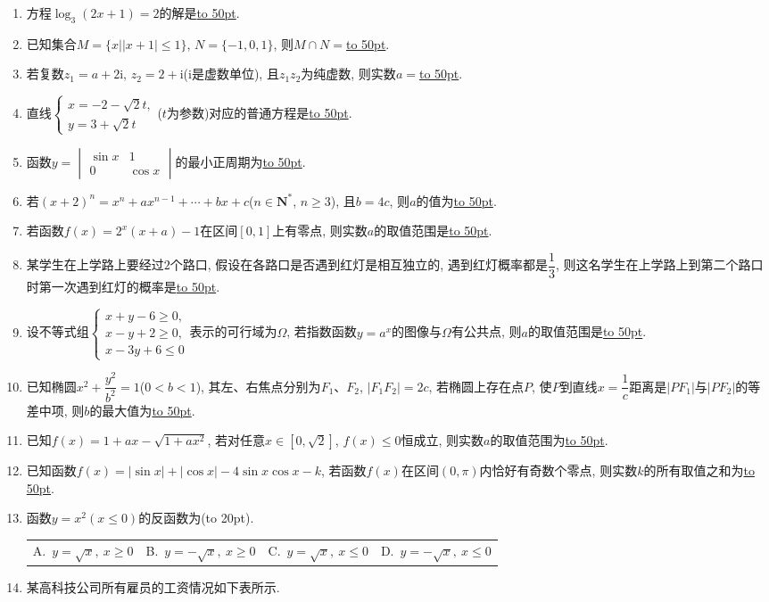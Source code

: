 \documentclass[10pt,a4paper]{article}
\newcommand{\blank}[1]{\underline{\hbox to #1pt{}}}
\newcommand{\bracket}[1]{(\hbox to #1pt{})}
\newcommand{\fourch}[4]{\par\begin{tabular}{p{.23\textwidth}p{.23\textwidth}p{.23\textwidth}p{.23\textwidth}}
A.~#1 &B.~#2& C.~#3& D.~#4
\end{tabular}}
\begin{document}
\begin{enumerate}[1.]
\item 方程$\log_3(2x+1)=2$的解是\blank{50}.
\item 已知集合$M=\{x||x+1|\le 1\}$, $N=\{-1,0,1\}$, 则$M\cap N=$\blank{50}.
\item 若复数$z_1=a+2\mathrm{i}$, $z_2=2+\mathrm{i}$($\mathrm{i}$是虚数单位), 且$z_1z_2$为纯虚数, 则实数$a=$\blank{50}.
\item 直线$\begin{cases} x=-2-\sqrt 2t, \\ y=3+\sqrt 2t \end{cases}$($t$为参数)对应的普通方程是\blank{50}.
\item 函数$y=\begin{vmatrix}
   \sin x & 1  \\0 & \cos x  \end{vmatrix}$的最小正周期为\blank{50}.
\item 若$(x+2)^n=x^n+ax^{n-1}+\cdots +bx+c$($n\in \mathbf{N}^*$, $ n\ge 3$), 且$b=4c$, 则$a$的值为\blank{50}.
\item 若函数$f(x)=2^x(x+a)-1$在区间$[0,1]$上有零点, 则实数$a$的取值范围是\blank{50}.
\item 某学生在上学路上要经过$2$个路口, 假设在各路口是否遇到红灯是相互独立的, 遇到红灯概率都是$\dfrac 13$, 则这名学生在上学路上到第二个路口时第一次遇到红灯的概率是\blank{50}.
\item 设不等式组$\begin{cases} x+y-6\ge 0, \\ x-y+2\ge 0, \\ x-3y+6\le 0 \end{cases}$表示的可行域为$\Omega$, 若指数函数$y=a^x$的图像与$\Omega$有公共点, 则$a$的取值范围是\blank{50}.
\item 已知椭圆$x^2+\dfrac{y^2}{b^2}=1$($0<b<1$), 其左、右焦点分别为$F_1$、$F_2$, $|F_1F_2|=2c$, 若椭圆上存在点$P$, 使$P$到直线$x=\dfrac 1c$距离是$|PF_1|$与$|PF_2|$的等差中项, 则$b$的最大值为\blank{50}.
\item 已知$f(x)=1+ax-\sqrt{1+ax^2}$, 若对任意$x\in [0,\sqrt 2]$, $f(x)\le 0$恒成立, 则实数$a$的取值范围为\blank{50}.
\item 已知函数$f(x)=|\sin x|+|\cos x|-4\sin x\cos x-k$, 若函数$f(x)$在区间$(0,\pi)$内恰好有奇数个零点, 则实数$k$的所有取值之和为\blank{50}.
\item 函数$y=x^2(x\le 0)$的反函数为\bracket{20}.
\fourch{$y=\sqrt{x}, \ x\ge 0$}{$y=-\sqrt{x}, \ x\ge 0$}{$y=\sqrt{x}, \ x\le 0$}{$y=-\sqrt{x}, \ x\le 0$}
\item 某高科技公司所有雇员的工资情况如下表所示.

\end{enumerate}
\end{document}
